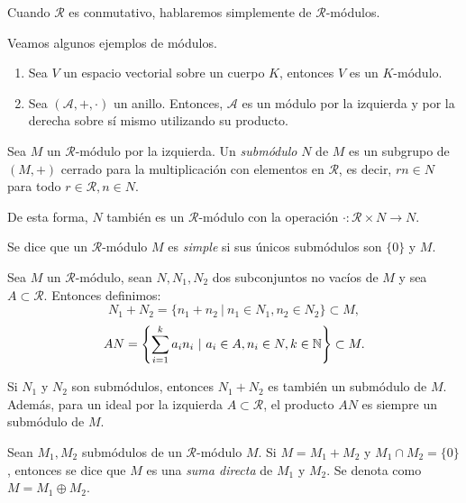 Cuando $\mathcal{R}$ es conmutativo, hablaremos simplemente de $\mathcal{R}$-módulos.

\begin{ejemplo} \label{ej:mod}
    Veamos algunos ejemplos de módulos.
    
    \begin{enumerate}
        \item Sea $V$ un espacio vectorial sobre un cuerpo $K$, entonces $V$ es un $K$-módulo.
        \item Sea $(\mathcal{A},+,\cdot)$ un anillo. Entonces, $\mathcal{A}$ es un módulo por la izquierda y por la derecha sobre sí mismo utilizando su producto.
    \end{enumerate}
    \end{ejemplo}

\begin{definicion}
Sea $M$ un $\mathcal{R}$-módulo por la izquierda. Un \emph{submódulo} $N$ de $M$ es un subgrupo de $(M,+)$ cerrado para la multiplicación con elementos en $\mathcal{R}$, es decir, $rn \in N$ para todo $r \in \mathcal{R}, n \in N$.
\end{definicion}

De esta forma, $N$ también es un $\mathcal{R}$-módulo con la operación $\cdot : \mathcal{R} \times N \rightarrow N.$

\begin{definicion}
Se dice que un $\mathcal{R}$-módulo $M$ es \emph{simple} si sus únicos submódulos son $\{0\}$ y $M$.
\end{definicion}

\begin{definicion}
Sea $M$ un $\mathcal{R}$-módulo, sean $N,N_1,N_2$ dos subconjuntos no vacíos de $M$ y sea $A \subset \mathcal{R}$. Entonces definimos:
$$N_1 + N_2 = \{n_1 + n_2 \ | \ n_1 \in N_1, n_2 \in N_2\} \subset M,$$
$$ AN = \left\{\sum_{i=1}^{k}a_in_i \ | \ a_i \in A, n_i \in N, k \in \mathbb{N} \right\} \subset M.$$
\end{definicion}

Si $N_1$ y $N_2$ son submódulos, entonces $N_1 + N_2$ es también un submódulo de $M$. Además, para un ideal por la izquierda $A \subset \mathcal{R}$, el producto $AN$ es siempre un submódulo de $M$.

\begin{definicion}
Sean $M_1,M_2$ submódulos de un $\mathcal{R}$-módulo $M$. Si $M = M_1 + M_2$ y $M_1 \cap M_2 = \{0\}$, entonces se dice que $M$ es una \emph{suma directa} de $M_1$ y $M_2$. Se denota como $M = M_1 \oplus M_2$. 
\end{definicion}

